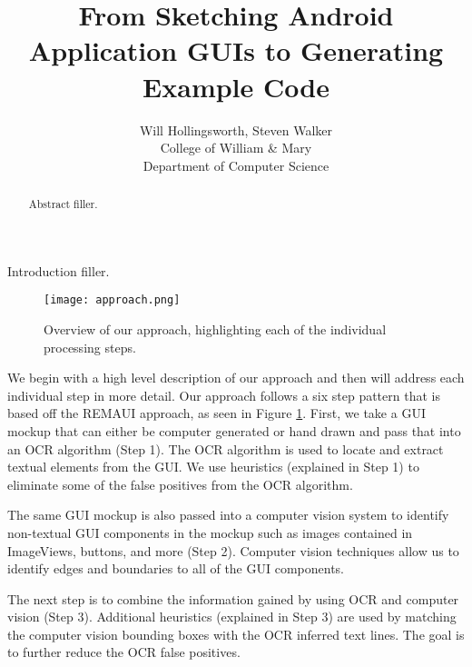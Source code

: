 \documentclass[10pt,twocolumn]{article}
\begin{document}
\title{From Sketching Android Application GUIs to Generating Example Code}

\author{Will Hollingsworth, Steven Walker\\
College of William \& Mary\\ Department of Computer Science
}

\maketitle
\thispagestyle{empty}

\begin{abstract}
   Abstract filler.
\end{abstract}




Introduction filler.



\begin{figure}[htb]
\centerline{
\texttt{[image: approach.png]}}
\caption{Overview of our approach, highlighting each of the individual processing steps.}
\label{fig:approach}
\end{figure}


We begin with a high level description of our approach and then will address
each individual step in more detail. Our approach follows a six step pattern
that is based off the REMAUI \cite{remaui} approach, as seen in Figure \ref{fig:approach}. First, we take a GUI mockup that can either be computer generated or hand drawn and pass that into an OCR algorithm (Step 1). The OCR algorithm is used to locate and extract textual elements from the GUI. We use heuristics (explained in Step 1) to eliminate some of the false positives from the OCR algorithm.

The same GUI mockup is also passed into a computer vision system to identify non-textual GUI components in the mockup such as images contained in ImageViews, buttons, and more (Step 2). Computer vision techniques allow us to identify edges and boundaries to all of the GUI components.

The next step is to combine the information gained by using OCR and computer vision (Step 3). Additional heuristics (explained in Step 3) are used by matching the computer vision bounding boxes with the OCR inferred text lines. The goal is to further reduce the OCR false positives.
\end{document}
